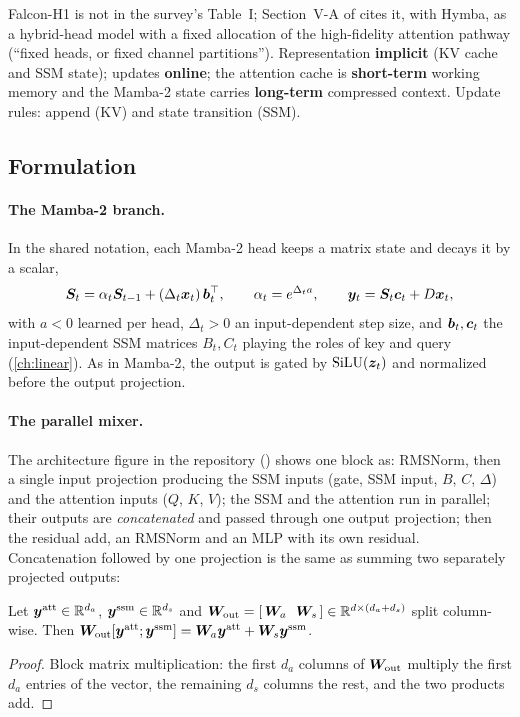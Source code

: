 \begin{taxonomy}
Falcon-H1 is not in the survey's Table~I; Section~V-A of \citet{zhoubian2026memory} cites it, with
Hymba, as a hybrid-head model with a fixed allocation of the high-fidelity attention pathway
(``fixed heads, or fixed channel partitions''). Representation \textbf{implicit} (KV cache and
SSM state); updates \textbf{online}; the attention cache is \textbf{short-term} working memory
and the Mamba-2 state carries \textbf{long-term} compressed context. Update rules: append (KV)
and state transition (SSM).
\end{taxonomy}

\subsection{Formulation}

\paragraph{The Mamba-2 branch.} In the shared notation, each Mamba-2 head keeps a matrix state
and decays it by a scalar,
\begin{equation}\label{eq:c12-mamba2}
  \bm{S}_t = \alpha_t\bm{S}_{t-1} + (\Delta_t\bm{x}_t)\,\bm{b}_t^{\top},\qquad \alpha_t = e^{\Delta_ta},\qquad
  \bm{y}_t = \bm{S}_t\bm{c}_t + D\bm{x}_t,
\end{equation}
with $a<0$ learned per head, $\Delta_t>0$ an input-dependent step size, and $\bm{b}_t,\bm{c}_t$ the
input-dependent SSM matrices $B_t,C_t$ playing the roles of key and query (\cref{ch:linear}).
As in Mamba-2, the output is gated by $\operatorname{SiLU}(\bm{z}_t)$ and normalized before the output projection.

\paragraph{The parallel mixer.} The architecture figure in the repository
() shows one block as:
RMSNorm, then a single input projection producing the SSM inputs (gate, SSM input, $B$, $C$,
$\Delta$) and the attention inputs ($Q$, $K$, $V$); the SSM and the attention run in parallel;
their outputs are \emph{concatenated} and passed through one output projection; then the residual
add, an RMSNorm and an MLP with its own residual. Concatenation followed by one projection is the
same as summing two separately projected outputs:

\begin{proposition}\label{prop:c12-concat}
Let $\bm{y}^{\mathrm{att}}\in\mathbb{R}^{d_a}$, $\bm{y}^{\mathrm{ssm}}\in\mathbb{R}^{d_s}$ and
$\mW_{\mathrm{out}} = [\,\mW_a\ \ \mW_s\,]\in\R^{d\times(d_a+d_s)}$ split column-wise. Then
$\bm{W}_{\mathrm{out}}[\bm{y}^{\mathrm{att}};\bm{y}^{\mathrm{ssm}}] = \bm{W}_a\bm{y}^{\mathrm{att}} +
\bm{W}_s\bm{y}^{\mathrm{ssm}}$.
\end{proposition}
\begin{proof}
Block matrix multiplication: the first $d_a$ columns of $\bm{W}_{\mathrm{out}}$ multiply the first
$d_a$ entries of the vector, the remaining $d_s$ columns the rest, and the two products add.
\end{proof}

